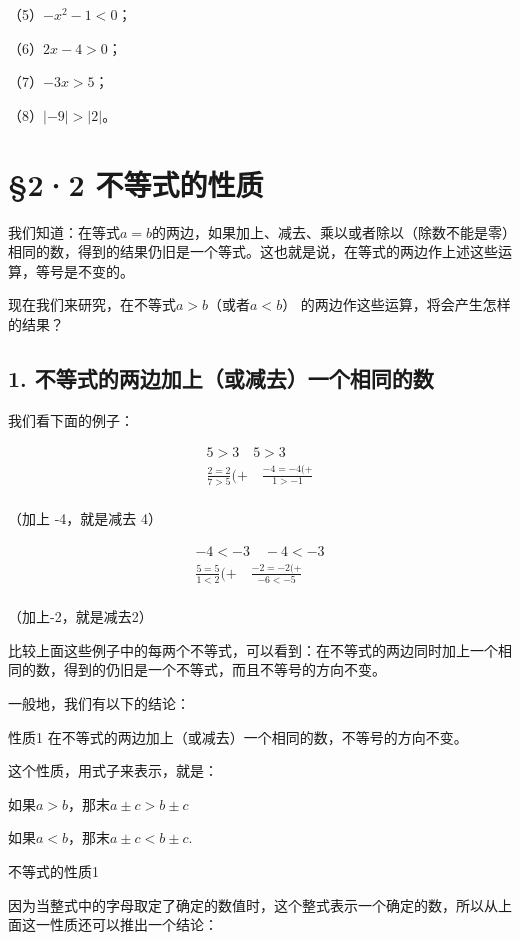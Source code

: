 （5）\(-x^{2} - 1 < 0\)；

（6）\(2x - 4 > 0\)；

（7）\(-3x > 5\)；

（8）\(|-9|>|2|\)。

\section{§2·2 不等式的性质}

我们知道：在等式\(a = b\)的两边，如果加上、减去、乘以或者除以（除数不能是零）相同的数，得到的结果仍旧是一个等式。这也就是说，在等式的两边作上述这些运算，等号是不变的。

现在我们来研究，在不等式\(a > b\)（或者\(a < b\)）
的两边作这些运算，将会产生怎样的结果？

\subsection{1. 不等式的两边加上（或减去）一个相同的数}

我们看下面的例子：

\[
\begin{array}{l} 5 > 3 \quad 5 > 3 \\ \frac{2 = 2}{7 > 5} (+ \quad \frac{- 4 = - 4 (+}{1 > - 1} \\ \end{array}
\]

（加上 -4，就是减去 4）

\[
\begin{array}{l} - 4 <   - 3 \quad - 4 <   - 3 \\ \frac{5 = 5}{1 <   2} (+ \quad \frac{- 2 = - 2 (+}{- 6 <   - 5} \\ \end{array}
\]

（加上-2，就是减去2）

比较上面这些例子中的每两个不等式，可以看到：在不等式的两边同时加上一个相同的数，得到的仍旧是一个不等式，而且不等号的方向不变。

一般地，我们有以下的结论：

性质1 在不等式的两边加上（或减去）一个相同的数，不等号的方向不变。

这个性质，用式子来表示，就是：

如果\(a > b\)，那末\(a \pm c > b \pm c\)

如果\(a < b\)，那末\(a \pm c < b \pm c.\)

不等式的性质1

因为当整式中的字母取定了确定的数值时，这个整式表示一个确定的数，所以从上面这一性质还可以推出一个结论：

